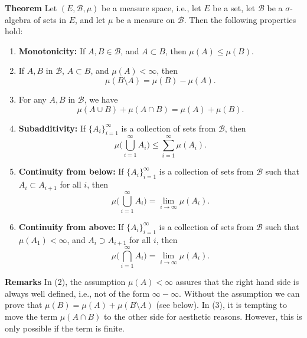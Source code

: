 \documentclass[12pt]{article}
\begin{document}
\newcommand{\cB}[0]{\mathcal{B}}

{\bf Theorem} \cite{folland, mukherjea, cohn, friedman}
Let $(E,\cB,\mu)$ be a measure space, i.e., 
let $E$ be a set, let $\cB$ be a $\sigma$-algebra of sets
in $E$, and let $\mu$ be a measure on $\cB$. 
Then the following properties hold:
\begin{enumerate}
\item {\bf Monotonicity:} If $A,B\in \cB$, and $A\subset B$, then $\mu(A)\le \mu(B)$.
\item If $A,B$ in $\cB$,  $A\subset B$, and $\mu(A)< \infty$, then 
$$\mu(B\setminus A) = \mu(B)-\mu(A).$$
\item For any  $A,B$ in $\cB$, we have
$$ \mu(A\cup B)+\mu(A\cap B) = \mu(A) + \mu(B).$$
\item {\bf Subadditivity:} If $\{A_i\}_{i=1}^\infty$ is a collection of sets from $\cB$, then
$$\mu\big(\bigcup_{i=1}^\infty A_i\big) \le \sum_{i=1}^\infty \mu(A_i).$$
\item {\bf Continuity from below:} 
If $\{A_i\}_{i=1}^\infty$ is a collection of sets from $\cB$ such that
$ A_i\subset A_{i+1}$ for all $i$, then 
$$ \mu\big(\bigcup_{i=1}^\infty A_i\big) = \lim_{i\to \infty} \mu(A_i).$$
\item {\bf Continuity from above:} 
If $\{A_i\}_{i=1}^\infty$ is a collection of sets from $\cB$ such that
$\mu(A_1)<\infty$, and $ A_i\supset A_{i+1}$ for all $i$, then 
$$ \mu\big(\bigcap_{i=1}^\infty A_i\big) = \lim_{i\to \infty}  \mu(A_i).$$
\end{enumerate}

{\bf Remarks} In (2), the assumption $\mu(A)<\infty$ assures 
that the right hand side is always well defined, i.e., not of 
the form $\infty-\infty$. Without the assumption we can prove that
$\mu(B) = \mu(A) + \mu(B\setminus A)$ (see below).
In (3), it is tempting to 
move the term $\mu(A\cap B)$ to the other side for aesthetic reasons. 
However, this is only possible if the term is finite. 
\end{document}
